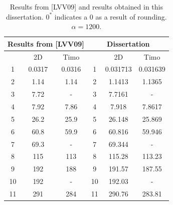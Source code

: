 \documentclass[../../main.tex]{subfiles}
\begin{document}
\begin{table}[!ht]
	\centering
	\caption{Results from [LVV09] and results obtained in this dissertation. $0^*$ indicates a 0 as a result of rounding. $\alpha = 1200$.}
	\begin{tabular}{|c|c|c||c|c|c|}
		\hline
		\multicolumn{3}{|c||}{Results from [LVV09]} & \multicolumn{3}{c|}{Dissertation} \\ \hline \hline
		~ & 2D & Timo & ~ & 2D & Timo  \\ \hline
		1 & 0.0317 & 0.0316 & 1 & 0.031713 & 0.031639  \\ 
		2 & 1.14 & 1.14  & 2 & 1.1413 & 1.1365  \\ 
		3 & 7.72 & - & 3 & 7.7161 & - \\ 
		4 & 7.92 & 7.86 &  4 & 7.918 & 7.8617    \\ 
		5 & 26.2 & 25.9 & 5 & 26.148 & 25.869   \\ 
		6 & 60.8 & 59.9 & 6 & 60.816 & 59.946  \\ 
		7 & 69.3 & - & 7 & 69.344 & -  \\ 
		8 & 115 & 113 &  8 & 115.28 & 113.23   \\ 
		9 & 192 & 188 &  9 & 191.57 & 187.55   \\ 
		10 & 192 & - & 10 & 192.03 & -  \\ 
		11 & 291 & 284 & 11 & 290.76 & 283.81   \\ \hline
	\end{tabular}\label{Results_LVV09}
\end{table}
\end{document}
